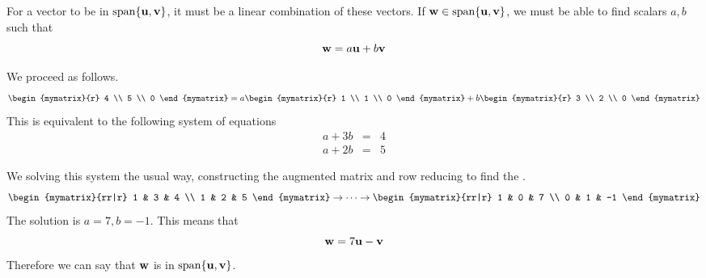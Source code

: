 \begin{solution}
For a vector to be in $\mbox{span} \{{\bf u}, {\bf v} \}$, it must be a linear combination of these vectors. If ${\bf w} \in \mbox{span} \{{\bf u}, {\bf v} \}$, we must be able to find scalars $a,b$ such that\[
{\bf w} = a {\bf u} +b {\bf v}
\]

We proceed as follows.
\[
\begin{mymatrix}{r}
4 \\
5 \\
0
\end{mymatrix}
=
a 
\begin{mymatrix}{r}
1 \\
1 \\
0
\end{mymatrix}
+
b
\begin{mymatrix}{r}
3 \\
2 \\
0
\end{mymatrix}
\]
This is equivalent to the following system of equations
\begin{eqnarray*}
a + 3b &=& 4 \\
a + 2b &=& 5
\end{eqnarray*}

We solving this system the usual way, constructing the augmented matrix and row reducing to find the {\rref}.
\[
\begin{mymatrix}{rr|r}
1 & 3 & 4 \\
1 & 2 & 5 
\end{mymatrix}
\rightarrow \cdots \rightarrow
\begin{mymatrix}{rr|r}
1 & 0 & 7 \\
0 & 1 & -1
\end{mymatrix}
\]
The solution is $a=7, b=-1$. This means that 
\[
{\bf w} = 7 {\bf u} - {\bf v}
\] 
Therefore we can say that ${\bf w}$ is in $\mbox{span} \{{\bf u}, {\bf v} \}$. 
\end{solution}
